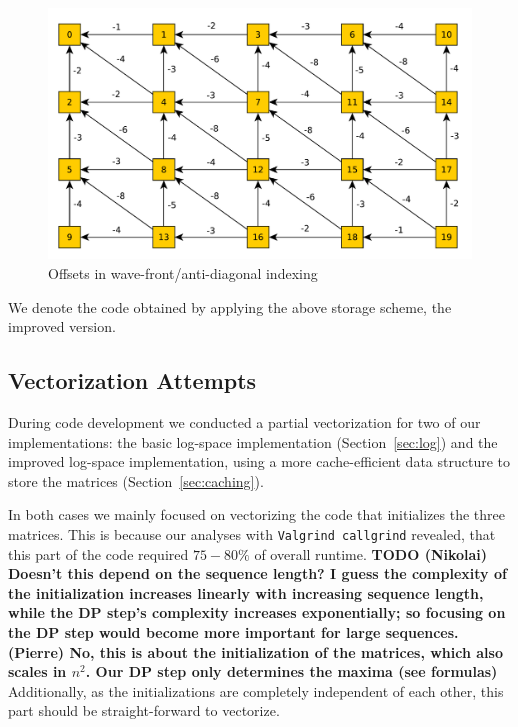 \documentclass[runningheads,a4paper]{llncs}
\begin{document}
\begin{figure}
\centering
\includegraphics[scale=0.5]{images/unnamed0.pdf}
\caption{Offsets in wave-front/anti-diagonal indexing}
\label{fig:offset}
\end{figure}


We denote the code obtained by applying the above storage scheme, the improved version.

\subsection{Vectorization Attempts}
\label{sec:vector}
During code development we conducted a partial vectorization for two of our implementations:
the basic log-space implementation (Section~\ref{sec:log}) and the improved log-space implementation, using a more
cache-efficient data structure to store the matrices (Section~\ref{sec:caching}).

In both cases we mainly focused on vectorizing the code that initializes the three matrices.
This is because our analyses with \texttt{Valgrind callgrind} revealed, that this
part of the code required $75-80\%$ of overall runtime.
\textbf{TODO (Nikolai) Doesn't this depend on the sequence length? I guess the
  complexity of the initialization increases linearly with increasing sequence length, while the
  DP step's complexity increases exponentially; so focusing on the DP step would
  become more important for large sequences. (Pierre) No, this is about the initialization of the matrices, which also scales in $n^2$. Our DP step only determines the maxima (see formulas)}
Additionally, as the initializations are completely independent of each other, this part should be straight-forward to vectorize.
\end{document}
